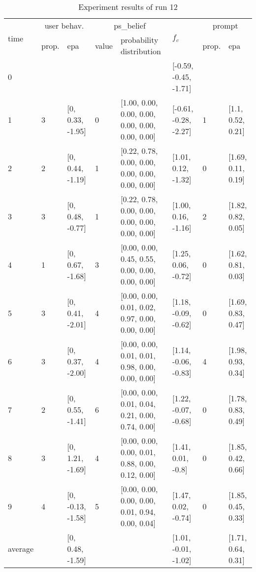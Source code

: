 

\begin{table}[htbp]\footnotesize
\caption{Experiment results of run 12}
\begin{tabular}{|p{0.4cm}|p{0.6cm}|l|p{0.6cm}|p{3.3cm}|l|p{0.6cm}|l|}
\hline

\multirow{2}{*}{time} & \multicolumn{2}{c|}{user behav.} & \multicolumn{2}{c|}{ps\_belief} &
\multirow{2}{*}{$f_c$} & \multicolumn{2}{c|}{prompt} \\ \cline{2-5}\cline{ 7- 8}
& prop. & epa & value & probability distribution &  & prop. & epa \\ \hline

0 & \multicolumn{1}{l|}{} &  & \multicolumn{1}{l|}{} &  & [-0.59, -0.45, -1.71] & \multicolumn{1}{l|}{} &  \\ \hline
1 & 3 & [0, 0.33, -1.95] & 0 & [1.00, 0.00, 0.00, 0.00, 0.00, 0.00, 0.00, 0.00] & [-0.61, -0.28, -2.27] & 1 & [1.1, 0.52, 0.21] \\ \hline
2 & 2 & [0, 0.44, -1.19] & 1 & [0.22, 0.78, 0.00, 0.00, 0.00, 0.00, 0.00, 0.00] & [1.01, 0.12, -1.32] & 0 & [1.69, 0.11, 0.19] \\ \hline
3 & 3 & [0, 0.48, -0.77] & 1 & [0.22, 0.78, 0.00, 0.00, 0.00, 0.00, 0.00, 0.00] & [1.00, 0.16, -1.16] & 2 & [1.82, 0.82, 0.05] \\ \hline
4 & 1 & [0, 0.67, -1.68] & 3 & [0.00, 0.00, 0.45, 0.55, 0.00, 0.00, 0.00, 0.00] & [1.25, 0.06, -0.72] & 0 & [1.62, 0.81, 0.03] \\ \hline
5 & 3 & [0, 0.41, -2.01] & 4 & [0.00, 0.00, 0.01, 0.02, 0.97, 0.00, 0.00, 0.00] & [1.18, -0.09, -0.62] & 0 & [1.69, 0.83, 0.47] \\ \hline
6 & 3 & [0, 0.37, -2.00] & 4 & [0.00, 0.00, 0.01, 0.01, 0.98, 0.00, 0.00, 0.00] & [1.14, -0.06, -0.83] & 4 & [1.98, 0.93, 0.34] \\ \hline
7 & 2 & [0, 0.55, -1.41] & 6 & [0.00, 0.00, 0.01, 0.04, 0.21, 0.00, 0.74, 0.00] & [1.22, -0.07, -0.68] & 0 & [1.78, 0.83, 0.49] \\ \hline
8 & 3 & [0, 1.21, -1.69] & 4 & [0.00, 0.00, 0.00, 0.01, 0.88, 0.00, 0.12, 0.00] & [1.41, 0.01, -0.8] & 0 & [1.85, 0.42, 0.66] \\ \hline
9 & 4 & [0, -0.13, -1.58] & 5 & [0.00, 0.00, 0.00, 0.00, 0.01, 0.94, 0.00, 0.04] & [1.47, 0.02, -0.74] & 0 & [1.85, 0.45, 0.33] \\ \hline
\multicolumn{1}{|l|}{average} & \multicolumn{1}{l|}{} & [0, 0.48, -1.59] & \multicolumn{1}{l|}{} &  & [1.01, -0.01, -1.02] & \multicolumn{1}{l|}{} & [1.71, 0.64, 0.31] \\ \hline
\end{tabular}
\label{}
\end{table}


